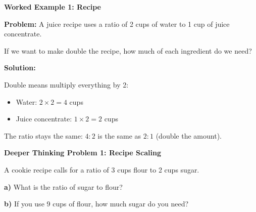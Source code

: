 \documentclass[12pt, letterpaper, fleqn]{article}
\begin{document}
\begin{tcolorbox}[colback=white, colframe=black!25, boxrule=0.6pt, arc=4mm, left=6mm, right=6mm, top=5mm, bottom=5mm]

\textbf{Worked Example 1: Recipe}

\medskip

\textbf{Problem:} A juice recipe uses a ratio of 2 cups of water to 1 cup of juice concentrate.

\noindent
If we want to make double the recipe, how much of each ingredient do we need?

\medskip

\noindent
\textbf{Solution:}

\medskip

\noindent
Double means multiply everything by 2:
\begin{itemize}
    \item Water: $2 \times 2 = 4$ cups
    \item Juice concentrate: $1 \times 2 = 2$ cups
\end{itemize}

\medskip

\noindent
The ratio stays the same: $4:2$ is the same as $2:1$ (double the amount).

\end{tcolorbox}

\vspace{4mm}

\begin{tcolorbox}[colback=white!15, colframe=black, boxrule=1.5pt, arc=4mm, left=6mm, right=6mm, top=5mm, bottom=5mm]

\textbf{Deeper Thinking Problem 1: Recipe Scaling}

\medskip

\noindent
A cookie recipe calls for a ratio of 3 cups flour to 2 cups sugar.

\noindent
\textbf{a)} What is the ratio of sugar to flour?

\vspace{3cm}

\noindent
\textbf{b)} If you use 9 cups of flour, how much sugar do you need?

\vspace{3cm}

\end{tcolorbox}
\end{document}
